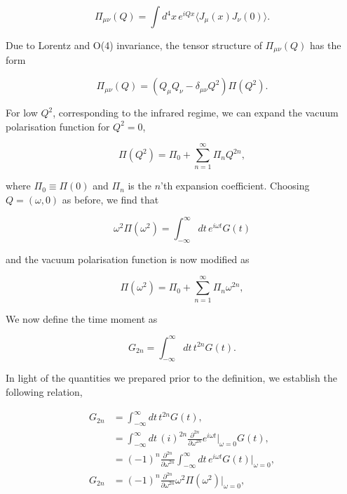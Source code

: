 \documentclass{article}
\numberwithin{equation}{section} %
\begin{document}
\begin{equation}
\Pi_{\mu\nu}(Q) = \int d^4x \, e^{iQx} \langle J_\mu(x) J_\nu(0) \rangle.
\end{equation}

\noindent Due to Lorentz and O(4) invariance\cite{vector}, the tensor structure of $\Pi_{\mu\nu}(Q)$ has the form 

\begin{equation}
\Pi_{\mu\nu}(Q) = \left( Q_\mu Q_\nu - \delta_{\mu\nu} Q^2 \right)\Pi(Q^2).
\end{equation}

For low $Q^2$, corresponding to the infrared regime, we can expand the vacuum polarisation function for $Q^2=0$,

\begin{equation}
\Pi(Q^2) = \Pi_0 + \sum_{n=1}^\infty \Pi_n Q^{2n},
\end{equation}

\noindent where $\Pi_0 \equiv \Pi(0)$ and $\Pi_n$ is the $n$'th expansion coefficient. Choosing $Q = (\omega, 0)$ as before, we find that 

\begin{equation}
\omega^2\Pi(\omega^2) = \int^\infty_{-\infty} dt\, e^{i\omega t} G(t)
\end{equation}

\noindent and the vacuum polarisation function is now modified as

\begin{equation}
\Pi(\omega^2) = \Pi_0 + \sum_{n=1}^\infty \Pi_n \omega^{2n},
\label{hvpf expansion}
\end{equation}

We now define the time moment as

\begin{equation}
G_{2n} = \int^\infty_{-\infty} dt \, t^{2n} G(t).
\end{equation}

In light of the quantities we prepared prior to the definition, we establish the following relation,

\begin{equation}
\begin{split}
G_{2n} &= \int^\infty_{-\infty} dt \, t^{2n} G(t),\\
&=  \int^\infty_{-\infty} dt \, (i)^{2n} \frac{\partial^{2n}}{\partial \omega^{2n}} e^{i\omega t} \bigg \vert_{\omega=0} G(t),\\
&=  (-1)^{n} \frac{\partial^{2n}}{\partial \omega^{2n}}\int^\infty_{-\infty} dt \,  e^{i\omega t} G(t) \bigg \vert_{\omega=0} ,\\
G_{2n}&=  (-1)^{n} \frac{\partial^{2n}}{\partial \omega^{2n}} \omega^2 \Pi(\omega^2)\bigg \vert_{\omega=0} ,\\
\end{split}
\end{equation}
\end{document}
